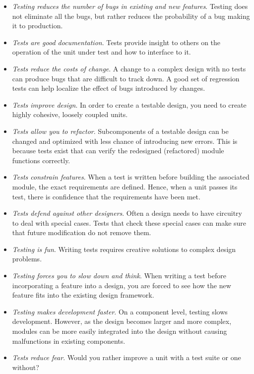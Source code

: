 \begin{itemize}
\item
  \emph{Testing reduces the number of bugs in existing and new
  features}. Testing does not eliminate all the bugs, but rather reduces
  the probability of a bug making it to production.
\item
  \emph{Tests are good documentation}. Tests provide insight to others
  on the operation of the unit under test and how to interface to it.
\item
  \emph{Tests reduce the costs of change}. A change to a complex design
  with no tests can produce bugs that are difficult to track down. A
  good set of regression tests can help localize the effect of bugs
  introduced by changes.
\item
  \emph{Tests improve design}. In order to create a testable design, you
  need to create highly cohesive, loosely coupled units.
\item
  \emph{Tests allow you to refactor}. Subcomponents of a testable design
  can be changed and optimized with less chance of introducing new
  errors. This is because tests exist that can verify the redesigned
  (refactored) module functions correctly.
\item
  \emph{Tests constrain features}. When a test is written before
  building the associated module, the exact requirements are defined.
  Hence, when a unit passes its test, there is confidence that the
  requirements have been met.
\item
  \emph{Tests defend against other designers}. Often a design needs to
  have circuitry to deal with special cases. Tests that check these
  special cases can make sure that future modification do not remove
  them.
\item
  \emph{Testing is fun}. Writing tests requires creative solutions to
  complex design problems.
\item
  \emph{Testing forces you to slow down and think}. When writing a test
  before incorporating a feature into a design, you are forced to see
  how the new feature fits into the existing design framework.
\item
  \emph{Testing makes development faster}. On a component level, testing
  slows development. However, as the design becomes larger and more
  complex, modules can be more easily integrated into the design without
  causing malfunctions in existing components.
\item
  \emph{Tests reduce fear}. Would you rather improve a unit with a test
  suite or one without?
\end{itemize}

